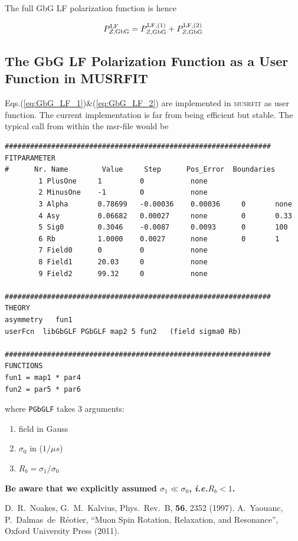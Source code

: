 \documentclass[twoside]{article}
\newcommand{\ie}{\emph{i.e.}\xspace}
\newcommand{\musrfithead}{MUSRFIT\xspace}
\newcommand{\musrfit}{\textsc{musrfit}\xspace}
\begin{document}
\noindent The full GbG LF polarization function is hence

\begin{equation}
   P_{Z,{\rm GbG}}^{\rm LF} = P_{Z,{\rm GbG}}^{\rm LF, (1)} + P_{Z,{\rm GbG}}^{\rm LF, (2)}
\end{equation}


\subsection*{The GbG LF Polarization Function as a User Function in \musrfithead}

Eqs.(\ref{eq:GbG_LF_1})\&(\ref{eq:GbG_LF_2}) are implemented in \musrfit as user function. The current implementation is far from being efficient but stable.
The typical call from within the msr-file would be

\begin{verbatim}
###############################################################
FITPARAMETER
#      Nr. Name        Value     Step      Pos_Error  Boundaries
        1 PlusOne     1         0           none
        2 MinusOne    -1        0           none
        3 Alpha       0.78699   -0.00036    0.00036     0       none
        4 Asy         0.06682   0.00027     none        0       0.33
        5 Sig0        0.3046    -0.0087     0.0093      0       100
        6 Rb          1.0000    0.0027      none        0       1
        7 Field0      0         0           none
        8 Field1      20.03     0           none
        9 Field2      99.32     0           none

###############################################################
THEORY
asymmetry   fun1
userFcn  libGbGLF PGbGLF map2 5 fun2   (field sigma0 Rb)

###############################################################
FUNCTIONS
fun1 = map1 * par4
fun2 = par5 * par6
\end{verbatim}

\noindent where \texttt{PGbGLF} takes 3 arguments: 

\begin{enumerate}
 \item field in Gauss
 \item $\sigma_0$ in ($1/\mu s$)
 \item $R_b = \sigma_1 / \sigma_0$
\end{enumerate}

\noindent \textbf{Be aware that we explicitly assumed $\sigma_1 \ll \sigma_0$, \ie $R_b < 1$.}


\begin{thebibliography}{1}

 D.~R.~Noakes, G.~M.~Kalvius, Phys.~Rev.~B, \textbf{56}, 2352
(1997).
 A.~Yaouanc, P.~Dalmas~de~R\'{e}otier, ``Muon Spin
Rotation, Relaxation, and Resonance'', Oxford University Press (2011). 

\end{thebibliography}
\end{document}
